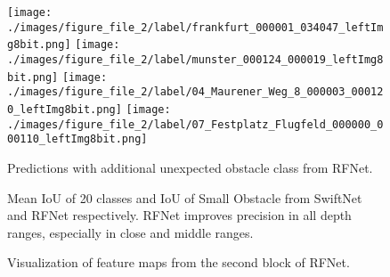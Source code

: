 \documentclass[letterpaper, 10 pt, journal, twoside]{ieeetran}
\begin{document}
\begin{figure}[ht]
{\begin{minipage}[b]{0.235\linewidth}
        \texttt{[image: ./images/figure\_file\_2/label/frankfurt\_000001\_034047\_leftImg8bit.png]}\vspace{0pt}
        \texttt{[image: ./images/figure\_file\_2/label/munster\_000124\_000019\_leftImg8bit.png]}\vspace{0pt}
        \texttt{[image: ./images/figure\_file\_2/label/04\_Maurener\_Weg\_8\_000003\_000120\_leftImg8bit.png]}\vspace{0pt}
        \texttt{[image: ./images/figure\_file\_2/label/07\_Festplatz\_Flugfeld\_000000\_000110\_leftImg8bit.png]}
    \end{minipage}}
    \caption[RFNet results]
    { \label{fig:RFNet_results}
    Predictions with additional unexpected obstacle class from RFNet.}
\end{figure}



\begin{figure}
    \centering
    \caption{Mean IoU of 20 classes and IoU of Small Obstacle from SwiftNet and RFNet respectively. RFNet improves precision in all depth ranges, especially in close and middle ranges.} 
    \label{fig:bar_graph}
    
\end{figure}


\begin{figure}[t]
    \centering
    \hspace{-6pt} 
    \hspace{-6pt}
    \hspace{-6pt}
\caption{Visualization of feature maps from the second block of RFNet.}
    \label{fig:feature_maps}
\end{figure}
\end{document}
